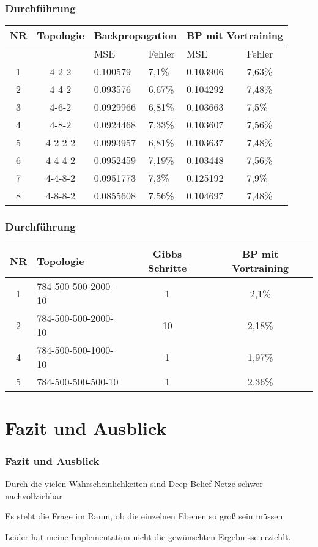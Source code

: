 \documentclass[12pt,titlepage]{beamer}
\begin{document}
	\begin{frame}
	\frametitle{Durchführung}
	\scriptsize
	\begin{tabularx}{\textwidth}{|c|c|X|X|X|X|}
	\hline
	NR & Topologie & \multicolumn{2}{|c|}{Backpropagation} & \multicolumn{2}{|c|}{BP mit Vortraining}  \\\hline
	&&MSE& Fehler&MSE& Fehler
	\\\hline
	1&4-2-2&0.100579&7,1\%&0.103906&7,63\%\\\hline
	2&4-4-2&0.093576&6,67\%&0.104292&7,48\%\\\hline
	3&4-6-2&0.0929966&6,81\%&0.103663&7,5\%\\\hline
	4&4-8-2&0.0924468&7,33\%&0.103607&7,56\%\\\hline
	5&4-2-2-2&0.0993957&6,81\%&0.103637&7,48\%\\\hline
	6&4-4-4-2&0.0952459&7,19\%&0.103448&7,56\%\\\hline
	7&4-4-8-2&0.0951773&7,3\%&0.125192&7,9\%\\\hline
	8&4-8-8-2&0.0855608&7,56\%&0.104697&7,48\%\\\hline
	\end{tabularx}
	\end{frame}
	\begin{frame}
	\frametitle{Durchführung}
	\scriptsize
	\begin{table}[H]
	\center
\begin{tabularx}{\textwidth}{|c|X|c|c|}
	\hline
	NR & Topologie &Gibbs Schritte& BP mit Vortraining
	\\\hline
	1&784-500-500-2000-10&1&2,1\%\\\hline
	2&784-500-500-2000-10&10&2,18\%\\\hline
	4&784-500-500-1000-10&1&1,97\%\\\hline
	5&784-500-500-500-10&1&2,36\%\\\hline
	\end{tabularx}
	\end{table}
	\end{frame}
	\section{Fazit und Ausblick}
	\begin{frame}
	\frametitle{Fazit und Ausblick}
	Durch die vielen Wahrscheinlichkeiten sind Deep-Belief Netze schwer nachvollziehbar
	
	Es steht die Frage im Raum, ob die einzelnen Ebenen so groß sein müssen
	
	Leider hat meine Implementation nicht die gewünschten Ergebnisse erziehlt.
	\end{frame}
	
	
	
	
	
	
	
	

	


	
\end{document}
